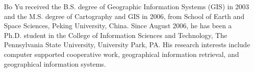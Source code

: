Bo Yu received the B.S. degree of Geographic Information Systems (GIS) in 2003 and the M.S. degree of Cartography and GIS in 2006, from School of Earth and Space Sciences, Peking University, China. Since August 2006, he has been a Ph.D. student in the College of Information Sciences and Technology, The Pennsylvania State University, University Park, PA. His research interests include computer supported cooperative work, geographical information retrieval, and geographical information systems.